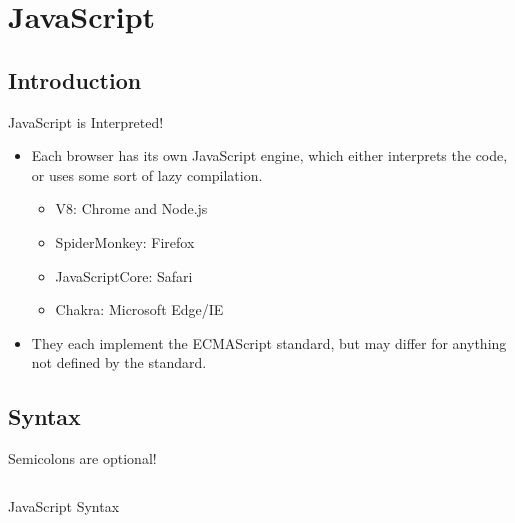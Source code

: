 \chapter{JavaScript}
\section{Introduction}
JavaScript is Interpreted!
\begin{itemize}
	\item Each browser has its own JavaScript engine, which either interprets the code,
	      or uses some sort of lazy compilation.
	      \begin{itemize}
		      \item V8: Chrome and Node.js
		      \item SpiderMonkey: Firefox
		      \item JavaScriptCore: Safari
		      \item Chakra: Microsoft Edge/IE
	      \end{itemize}
	\item They each implement the ECMAScript standard, but may differ for anything not
	      defined by the standard.
\end{itemize}

\section{Syntax}
Semicolons are optional!
\begin{code}
	\inputminted{js}{src0/0-syntax.js}
	\caption{JavaScript Syntax}
\end{code}

